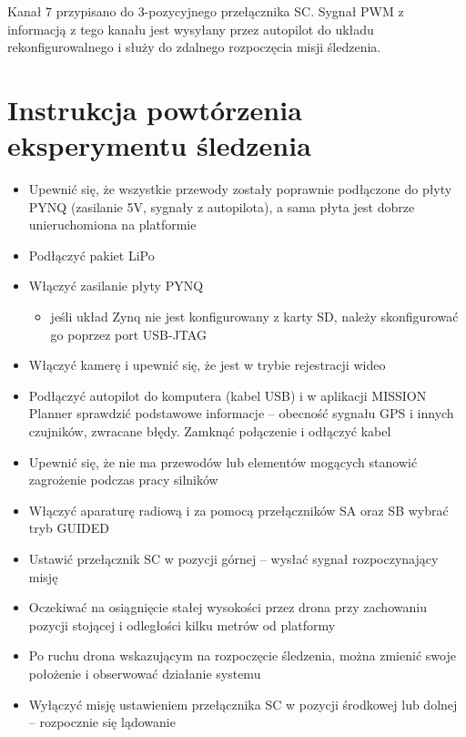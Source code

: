 Kanał 7 przypisano do 3-pozycyjnego przełącznika SC. Sygnał PWM z informacją z tego kanału jest wysyłany przez autopilot do układu rekonfigurowalnego i służy do zdalnego rozpoczęcia misji śledzenia.


\section{Instrukcja powtórzenia eksperymentu śledzenia}

\begin{itemize}
	\item Upewnić się, że wszystkie przewody zostały poprawnie podłączone do płyty PYNQ (zasilanie 5V, sygnały z autopilota), a sama płyta jest dobrze unieruchomiona na platformie
	\item Podłączyć pakiet LiPo
	\item Włączyć zasilanie płyty PYNQ
	\begin{itemize}
		\item jeśli układ Zynq nie jest konfigurowany z karty SD, należy skonfigurować go poprzez port USB-JTAG
	\end{itemize}	
	\item Włączyć kamerę i upewnić się, że jest w trybie rejestracji wideo
	\item Podłączyć autopilot do komputera (kabel USB) i w aplikacji MISSION Planner sprawdzić podstawowe informacje -- obecność sygnału GPS i innych czujników, zwracane błędy. Zamknąć połączenie i odłączyć kabel
	\item Upewnić się, że nie ma przewodów lub elementów mogących stanowić zagrożenie podczas pracy silników
	\item Włączyć aparaturę radiową i za pomocą przełączników SA oraz SB wybrać tryb GUIDED
	\item Ustawić przełącznik SC w pozycji górnej -- wysłać sygnał rozpoczynający misję 
	\item Oczekiwać na osiągnięcie stałej wysokości przez drona przy zachowaniu pozycji stojącej i odległości kilku metrów od platformy
	\item Po ruchu drona wskazującym na rozpoczęcie śledzenia, można zmienić swoje położenie i obserwować działanie systemu 
	\item Wyłączyć misję ustawieniem przełącznika SC w pozycji środkowej lub dolnej -- rozpocznie się lądowanie 
\end{itemize}